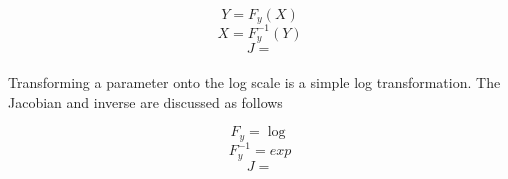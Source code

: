 $$ Y = F_y(X) $$
$$ X = F_y^{-1}(Y) $$
$$ J = $$
\paragraph[log]{}
Transforming a parameter onto the log scale is a simple log transformation. The Jacobian and inverse are discussed as follows

$$ F_y = \log $$
$$ F_y^{-1} = exp $$
$$ J =  $$

\paragraph[Inverse]{}


\paragraph[Log odds]{}

\paragraph[Simplex]{}
